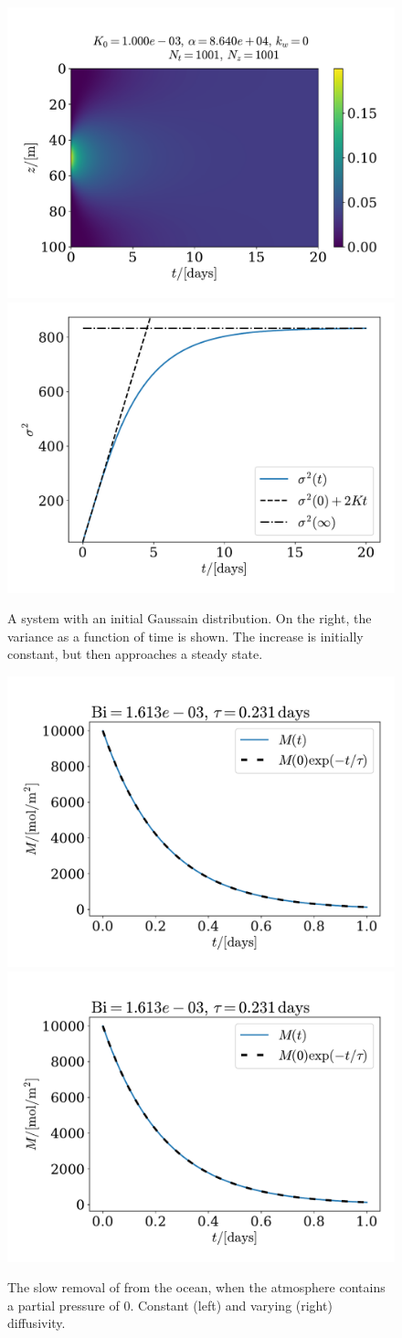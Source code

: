 \documentclass{article}
\begin{document}
    \begin{figure}[H]
        \centering
        \includegraphics[width=.49\textwidth]{../plots/test3}
        \includegraphics[width=.45\textwidth]{../plots/test3_var}
        \caption{A system with an initial Gaussain distribution.
        On the right, the variance as a function of time is shown.
        The increase is initially constant, but then approaches a steady state.}
        \label{var}
    \end{figure}

    \begin{figure}[H]
        \centering
        \includegraphics[width=.49\textwidth]{../plots/test4_decay}
        \includegraphics[width=.49\textwidth]{../plots/test4_varK_decay}
        \caption{The slow removal of  from the ocean, when the atmosphere contains a partial pressure of 0.
        Constant (left) and varying (right) diffusivity.}
        \label{decay}
    \end{figure}
\end{document}
